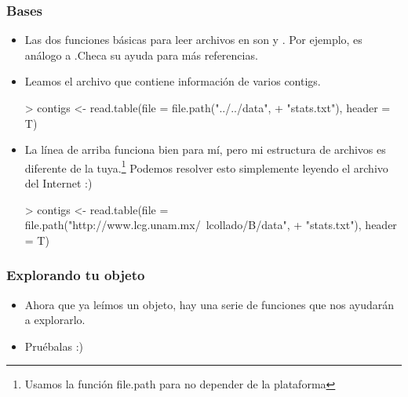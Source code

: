\begin{frame}
  \frametitle{Bases}
  \begin{itemize}
  \item Las dos funciones b\'asicas para leer archivos en  son  y . Por ejemplo,  es an\'alogo a .Checa su ayuda para m\'as referencias.
  \item Leamos el archivo  que contiene informaci\'on de varios contigs.
  \scriptsize
\begin{Schunk}
\begin{Sinput}
> contigs <- read.table(file = file.path("../../data", 
+     "stats.txt"), header = T)
\end{Sinput}
\end{Schunk}
  \item \normalsize La línea de arriba funciona bien para mí, pero mi estructura de archivos es diferente de la tuya.\footnote{Usamos la función file.path para no depender de la plataforma} Podemos resolver esto simplemente leyendo el archivo del Internet :) 
  \scriptsize 
\begin{Schunk}
\begin{Sinput}
> contigs <- read.table(file = file.path("http://www.lcg.unam.mx/~lcollado/B/data", 
+     "stats.txt"), header = T)
\end{Sinput}
\end{Schunk}
\normalsize
  \end{itemize}
\end{frame}

\begin{frame}
  \frametitle{Explorando tu objeto}
  \begin{itemize}
  \item Ahora que ya le\'imos un objeto, hay una serie de funciones que nos ayudar\'an a explorarlo.
  \item Pru\'ebalas :)
\begin{Schunk}
\end{Schunk}
  \end{itemize}
\end{frame}


